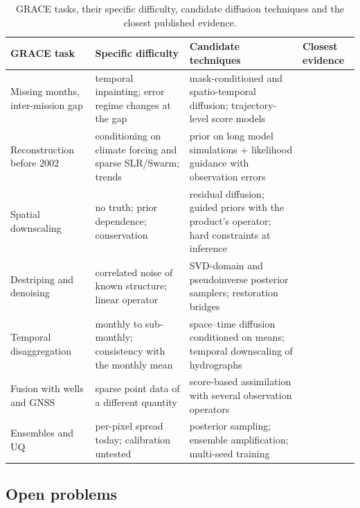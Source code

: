 \begin{table}[!t]
\centering
\caption{GRACE tasks, their specific difficulty, candidate diffusion techniques and the closest published evidence.}
\label{tab:map}
\footnotesize
\begin{tabularx}{\textwidth}{@{}l L L L@{}}
\toprule
GRACE task & Specific difficulty & Candidate techniques & Closest evidence \\
\midrule
Missing months, inter-mission gap & temporal inpainting; error regime changes at the gap & mask-conditioned and spatio-temporal diffusion; trajectory-level score models & \cite{lugmayr2022repaint,tashiro2021csdi,rozet2023sda,kishikawa2025precipinpaint,barth2024dindiff} \\
Reconstruction before 2002 & conditioning on climate forcing and sparse SLR/Swarm; trends & prior on long model simulations + likelihood guidance with observation errors & \cite{qian2026gencrest,song2025reconmost,uz2024highres,richter2021swarm_reconstruction} \\
Spatial downscaling & no truth; prior dependence; conservation & residual diffusion; guided priors with the product's operator; hard constraints at inference & \cite{mardani2025corrdiff,lopezgomez2025r2d2,tie2026zssd,hess2025scaleadaptive,bochow2026smb,harder2023hard} \\
Destriping and denoising & correlated noise of known structure; linear operator & SVD-domain and pseudoinverse posterior samplers; restoration bridges & \cite{kawar2022ddrm,song2023pigdm,chung2023dps,liu2023i2sb} \\
Temporal disaggregation & monthly to sub-monthly; consistency with the monthly mean & space--time diffusion conditioned on means; temporal downscaling of hydrographs & \cite{bassetti2024diffesm,yang2026hdiffusion} \\
Fusion with wells and GNSS & sparse point data of a different quantity & score-based assimilation with several observation operators & \cite{manshausen2025genda,chakraborty2025multimodal,li2026sage,pakrashi2026highplains} \\
Ensembles and UQ & per-pixel spread today; calibration untested & posterior sampling; ensemble amplification; multi-seed training & \cite{li2024seeds,price2025gencast,singh2026intercomparison,gou2026uncertainty} \\
\bottomrule
\end{tabularx}
\end{table}

\subsection{Open problems}

